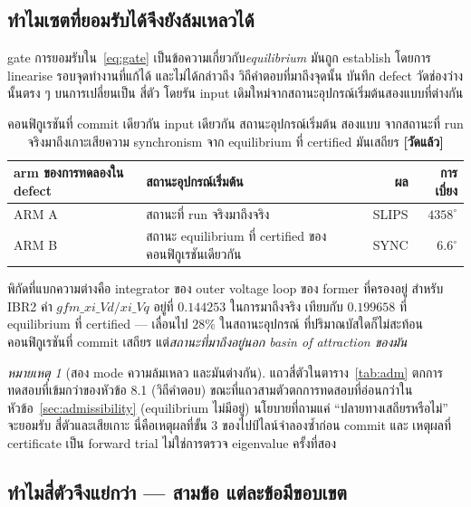 \documentclass[12pt,a4paper]{article}
\theoremstyle{remark}
\newtheorem{remark}{หมายเหตุ}
\newcommand{\measured}{\textcolor{ok}{\textbf{[วัดแล้ว]}}}
\begin{document}
\subsection{ทำไมเซตที่ยอมรับได้จึงยังล้มเหลวได้}

gate การยอมรับใน~\eqref{eq:gate} เป็นข้อความเกี่ยวกับ\emph{equilibrium}
มันถูก establish โดยการ linearise รอบจุดทำงานที่แก้ได้ และไม่ได้กล่าวถึง
วิถีคำตอบที่มาถึงจุดนั้น บันทึก defect วัดช่องว่างนั้นตรง ๆ บนการเปลี่ยนเป็น
สี่ตัว โดยรัน input เดิมใหม่จากสถานะอุปกรณ์เริ่มต้นสองแบบที่ต่างกัน

\begin{table}[H]
\centering
\small
\begin{tabular}{@{}llrr@{}}
\toprule
\textbf{arm ของการทดลองใน defect} & \textbf{สถานะอุปกรณ์เริ่มต้น} & \textbf{ผล} & \textbf{การเบี่ยง}\\
\midrule
ARM A & สถานะที่ run จริงมาถึงจริง & SLIPS & $4358^{\circ}$\\
ARM B & สถานะ equilibrium ที่ certified ของคอนฟิกูเรชันเดียวกัน & SYNC & $6.6^{\circ}$\\
\bottomrule
\end{tabular}
\caption{คอนฟิกูเรชันที่ commit เดียวกัน input เดียวกัน สถานะอุปกรณ์เริ่มต้น
สองแบบ จากสถานะที่ run จริงมาถึงเกาะเสียความ synchronism จาก equilibrium
ที่ certified มันเสถียร \measured}
\label{tab:arm}
\end{table}

พิกัดที่แบกความต่างคือ integrator ของ outer voltage loop ของ former ที่ครองอยู่
สำหรับ IBR2 ค่า $gfm\_xi\_Vd/xi\_Vq$ อยู่ที่ $0.144253$ ในการมาถึงจริง เทียบกับ
$0.199658$ ที่ equilibrium ที่ certified --- เลื่อนไป $28\%$ ในสถานะอุปกรณ์
ที่ปริมาณบัสใดก็ไม่สะท้อน คอนฟิกูเรชันที่ commit เสถียร
แต่\emph{สถานะที่มาถึงอยู่นอก basin of attraction ของมัน}

\begin{remark}[สอง mode ความล้มเหลว และมันต่างกัน]
แถวสี่ตัวในตาราง~\ref{tab:adm} ตกการทดสอบที่เข้มกว่าของหัวข้อ 8.1 (วิถีคำตอบ)
ขณะที่แถวสามตัวตกการทดสอบที่อ่อนกว่าในหัวข้อ~\ref{sec:admissibility}
(equilibrium ไม่มีอยู่) นโยบายที่ถามแค่ ``ปลายทางเสถียรหรือไม่'' จะยอมรับ
สี่ตัวและเสียเกาะ นี่คือเหตุผลที่ขั้น 3 ของไปป์ไลน์จำลองซ้ำก่อน commit และ
เหตุผลที่ certificate เป็น forward trial ไม่ใช่การตรวจ eigenvalue ครั้งที่สอง
\end{remark}

\subsection{ทำไมสี่ตัวจึงแย่กว่า --- สามข้อ แต่ละข้อมีขอบเขต}
\end{document}
